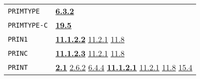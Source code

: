 \documentclass[a4paper,]{article}
\begin{document}
\begin{longtable}[]{@{}ll@{}}
\begin{minipage}[t]{0.24\columnwidth}\raggedright\strut
\texttt{PRIMTYPE}\strut
\end{minipage} & \begin{minipage}[t]{0.70\columnwidth}\raggedright\strut
\textbf{\href{06-data-types.md\#632-primtype-1}{6.3.2}}\strut
\end{minipage}\tabularnewline
\begin{minipage}[t]{0.24\columnwidth}\raggedright\strut
\texttt{PRIMTYPE-C}\strut
\end{minipage} & \begin{minipage}[t]{0.70\columnwidth}\raggedright\strut
\textbf{\href{19-compiled-programs.md\#195-type-c-and-type-w}{19.5}}\strut
\end{minipage}\tabularnewline
\begin{minipage}[t]{0.24\columnwidth}\raggedright\strut
\texttt{PRIN1}\strut
\end{minipage} & \begin{minipage}[t]{0.70\columnwidth}\raggedright\strut
\textbf{\href{11-input-output.md\#11122-prin1}{11.1.2.2}} \href{11-input-output.md\#1121-open}{11.2.1}
\href{11-input-output.md\#118-terminal-channels}{11.8}\strut
\end{minipage}\tabularnewline
\begin{minipage}[t]{0.24\columnwidth}\raggedright\strut
\texttt{PRINC}\strut
\end{minipage} & \begin{minipage}[t]{0.70\columnwidth}\raggedright\strut
\textbf{\href{11-input-output.md\#11123-princ}{11.1.2.3}} \href{11-input-output.md\#1121-open}{11.2.1}
\href{11-input-output.md\#118-terminal-channels}{11.8}\strut
\end{minipage}\tabularnewline
\begin{minipage}[t]{0.24\columnwidth}\raggedright\strut
\texttt{PRINT}\strut
\end{minipage} & \begin{minipage}[t]{0.70\columnwidth}\raggedright\strut
\textbf{\href{02-read-evaluate-print.md\#21-general-1}{2.1}}
\href{02-read-evaluate-print.md\#262-read-and-print-versus-floating-point-numbers}{2.6.2}
\href{06-data-types.md\#644-printtype-evaltype-and-applytype}{6.4.4}
\textbf{\href{11-input-output.md\#11121-print}{11.1.2.1}} \href{11-input-output.md\#1121-open}{11.2.1}
\href{11-input-output.md\#118-terminal-channels}{11.8} \href{15-lexical-blocking.md\#154-print-and-oblists}{15.4}\strut
\end{minipage}\tabularnewline

\end{longtable}
\end{document}
